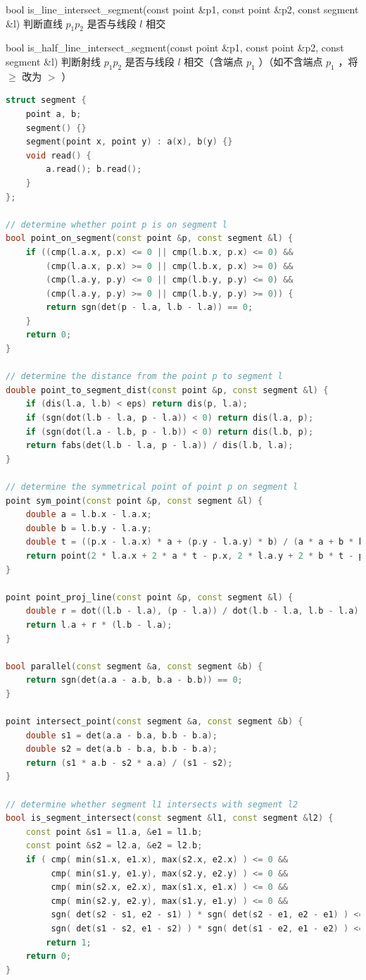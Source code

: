 \documentclass{article}
\begin{document}
bool is\_line\_intersect\_segment(const point \&p1, const point \&p2, const segment \&l) 判断直线 $p_1p_2$ 是否与线段 $l$ 相交

bool is\_half\_line\_intersect\_segment(const point \&p1, const point \&p2, const segment \&l) 判断射线 $p_1p_2$ 是否与线段 $l$ 相交（含端点 $p_1$ ）（如不含端点 $p_1$ ，将 $\geq$ 改为 $>$ ）

\begin{lstlisting}[language=C++]
struct segment {
	point a, b;
	segment() {}
	segment(point x, point y) : a(x), b(y) {}
	void read() {
		a.read(); b.read();
	}
};

// determine whether point p is on segment l
bool point_on_segment(const point &p, const segment &l) {
	if ((cmp(l.a.x, p.x) <= 0 || cmp(l.b.x, p.x) <= 0) &&
		(cmp(l.a.x, p.x) >= 0 || cmp(l.b.x, p.x) >= 0) &&
		(cmp(l.a.y, p.y) <= 0 || cmp(l.b.y, p.y) <= 0) &&
		(cmp(l.a.y, p.y) >= 0 || cmp(l.b.y, p.y) >= 0)) {
		return sgn(det(p - l.a, l.b - l.a)) == 0;
	}
	return 0;
}

// determine the distance from the point p to segment l
double point_to_segment_dist(const point &p, const segment &l) {
	if (dis(l.a, l.b) < eps) return dis(p, l.a);
	if (sgn(dot(l.b - l.a, p - l.a)) < 0) return dis(l.a, p);
	if (sgn(dot(l.a - l.b, p - l.b)) < 0) return dis(l.b, p);
	return fabs(det(l.b - l.a, p - l.a)) / dis(l.b, l.a);
}

// determine the symmetrical point of point p on segment l
point sym_point(const point &p, const segment &l) {
	double a = l.b.x - l.a.x;
	double b = l.b.y - l.a.y;
	double t = ((p.x - l.a.x) * a + (p.y - l.a.y) * b) / (a * a + b * b);
	return point(2 * l.a.x + 2 * a * t - p.x, 2 * l.a.y + 2 * b * t - p.y);
}

point point_proj_line(const point &p, const segment &l) {
	double r = dot((l.b - l.a), (p - l.a)) / dot(l.b - l.a, l.b - l.a);
	return l.a + r * (l.b - l.a);
}

bool parallel(const segment &a, const segment &b) {
	return sgn(det(a.a - a.b, b.a - b.b)) == 0;
}

point intersect_point(const segment &a, const segment &b) {
	double s1 = det(a.a - b.a, b.b - b.a);
	double s2 = det(a.b - b.a, b.b - b.a);
	return (s1 * a.b - s2 * a.a) / (s1 - s2);
}

// determine whether segment l1 intersects with segment l2
bool is_segment_intersect(const segment &l1, const segment &l2) {
	const point &s1 = l1.a, &e1 = l1.b;
	const point &s2 = l2.a, &e2 = l2.b;
	if ( cmp( min(s1.x, e1.x), max(s2.x, e2.x) ) <= 0 &&
		 cmp( min(s1.y, e1.y), max(s2.y, e2.y) ) <= 0 &&
		 cmp( min(s2.x, e2.x), max(s1.x, e1.x) ) <= 0 &&
		 cmp( min(s2.y, e2.y), max(s1.y, e1.y) ) <= 0 &&
		 sgn( det(s2 - s1, e2 - s1) ) * sgn( det(s2 - e1, e2 - e1) ) <= 0 &&
		 sgn( det(s1 - s2, e1 - s2) ) * sgn( det(s1 - e2, e1 - e2) ) <= 0)
		return 1;
	return 0;
}


\end{lstlisting}
\end{document}
